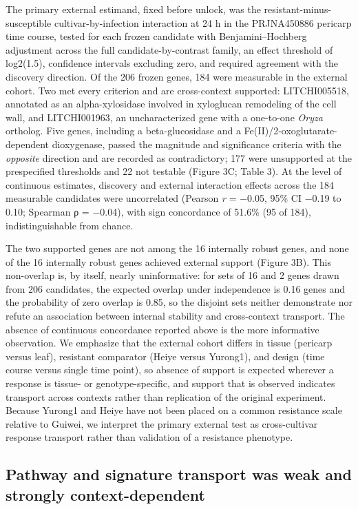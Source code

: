 \documentclass[12pt,letterpaper]{article}
\begin{document}
The primary external estimand, fixed before unlock, was the resistant-minus-susceptible cultivar-by-infection interaction at 24 h in the PRJNA450886 pericarp time course, tested for each frozen candidate with Benjamini–Hochberg adjustment across the full candidate-by-contrast family, an effect threshold of log2(1.5), confidence intervals excluding zero, and required agreement with the discovery direction. Of the 206 frozen genes, 184 were measurable in the external cohort. Two met every criterion and are cross-context supported: LITCHI005518, annotated as an alpha-xylosidase involved in xyloglucan remodeling of the cell wall, and LITCHI001963, an uncharacterized gene with a one-to-one \textit{Oryza} ortholog. Five genes, including a beta-glucosidase and a Fe(II)/2-oxoglutarate-dependent dioxygenase, passed the magnitude and significance criteria with the \textit{opposite} direction and are recorded as contradictory; 177 were unsupported at the prespecified thresholds and 22 not testable (Figure 3C; Table 3). At the level of continuous estimates, discovery and external interaction effects across the 184 measurable candidates were uncorrelated (Pearson \textit{r} = −0.05, 95\% CI −0.19 to 0.10; Spearman ρ = −0.04), with sign concordance of 51.6\% (95 of 184), indistinguishable from chance.

The two supported genes are not among the 16 internally robust genes, and none of the 16 internally robust genes achieved external support (Figure 3B). This non-overlap is, by itself, nearly uninformative: for sets of 16 and 2 genes drawn from 206 candidates, the expected overlap under independence is 0.16 genes and the probability of zero overlap is 0.85, so the disjoint sets neither demonstrate nor refute an association between internal stability and cross-context transport. The absence of continuous concordance reported above is the more informative observation. We emphasize that the external cohort differs in tissue (pericarp versus leaf), resistant comparator (Heiye versus Yurong1), and design (time course versus single time point), so absence of support is expected wherever a response is tissue- or genotype-specific, and support that is observed indicates transport across contexts rather than replication of the original experiment. Because Yurong1 and Heiye have not been placed on a common resistance scale relative to Guiwei, we interpret the primary external test as cross-cultivar response transport rather than validation of a resistance phenotype.

\subsection*{Pathway and signature transport was weak and strongly context-dependent}
\end{document}
